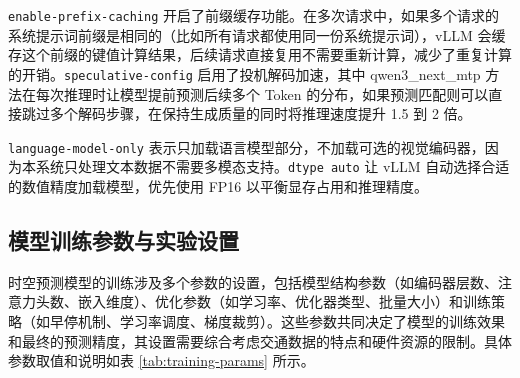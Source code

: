 \texttt{enable-prefix-caching} 开启了前缀缓存功能。在多次请求中，如果多个请求的系统提示词前缀是相同的（比如所有请求都使用同一份系统提示词），vLLM 会缓存这个前缀的键值计算结果，后续请求直接复用不需要重新计算，减少了重复计算的开销。\texttt{speculative-config} 启用了投机解码加速，其中 qwen3\_next\_mtp 方法在每次推理时让模型提前预测后续多个 Token 的分布，如果预测匹配则可以直接跳过多个解码步骤，在保持生成质量的同时将推理速度提升 1.5 到 2 倍。

\texttt{language-model-only} 表示只加载语言模型部分，不加载可选的视觉编码器，因为本系统只处理文本数据不需要多模态支持。\texttt{dtype auto} 让 vLLM 自动选择合适的数值精度加载模型，优先使用 FP16 以平衡显存占用和推理精度。

\subsection{模型训练参数与实验设置}

时空预测模型的训练涉及多个参数的设置，包括模型结构参数（如编码器层数、注意力头数、嵌入维度）、优化参数（如学习率、优化器类型、批量大小）和训练策略（如早停机制、学习率调度、梯度裁剪）。这些参数共同决定了模型的训练效果和最终的预测精度，其设置需要综合考虑交通数据的特点和硬件资源的限制。具体参数取值和说明如表 \ref{tab:training-params} 所示。

